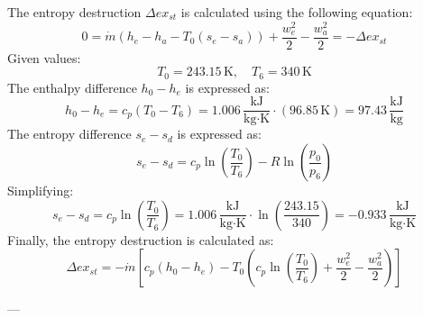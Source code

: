 The entropy destruction \( \Delta ex_{st} \) is calculated using the following equation:  
\[
0 = \dot{m} (h_e - h_a - T_0 (s_e - s_a)) + \frac{w_e^2}{2} - \frac{w_a^2}{2} = -\Delta ex_{st}
\]  
Given values:  
\[
T_0 = 243.15 \, \text{K}, \quad T_6 = 340 \, \text{K}
\]  
The enthalpy difference \( h_0 - h_e \) is expressed as:  
\[
h_0 - h_e = c_p (T_0 - T_6) = 1.006 \, \frac{\text{kJ}}{\text{kg·K}} \cdot (96.85 \, \text{K}) = 97.43 \, \frac{\text{kJ}}{\text{kg}}
\]  
The entropy difference \( s_e - s_d \) is expressed as:  
\[
s_e - s_d = c_p \ln \left( \frac{T_0}{T_6} \right) - R \ln \left( \frac{p_0}{p_6} \right)
\]  
Simplifying:  
\[
s_e - s_d = c_p \ln \left( \frac{T_0}{T_6} \right) = 1.006 \, \frac{\text{kJ}}{\text{kg·K}} \cdot \ln \left( \frac{243.15}{340} \right) = -0.933 \, \frac{\text{kJ}}{\text{kg·K}}
\]  
Finally, the entropy destruction is calculated as:  
\[
\Delta ex_{st} = -\dot{m} \left[ c_p (h_0 - h_e) - T_0 \left( c_p \ln \left( \frac{T_0}{T_6} \right) + \frac{w_e^2}{2} - \frac{w_a^2}{2} \right) \right]
\]  

---